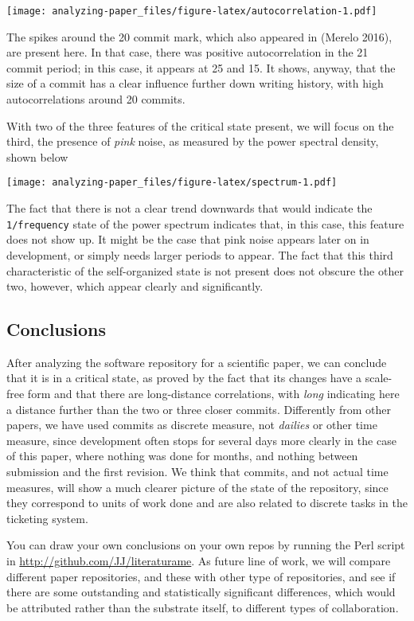 \documentclass[]{article}
\begin{document}
\texttt{[image: analyzing-paper\_files/figure-latex/autocorrelation-1.pdf]}

The spikes around the 20 commit mark, which also appeared in (Merelo
2016), are present here. In that case, there was positive
autocorrelation in the 21 commit period; in this case, it appears at 25
and 15. It shows, anyway, that the size of a commit has a clear
influence further down writing history, with high autocorrelations
around 20 commits.

With two of the three features of the critical state present, we will
focus on the third, the presence of \emph{pink} noise, as measured by
the power spectral density, shown below

\texttt{[image: analyzing-paper\_files/figure-latex/spectrum-1.pdf]}

The fact that there is not a clear trend downwards that would indicate
the \texttt{1/frequency} state of the power spectrum indicates that, in
this case, this feature does not show up. It might be the case that pink
noise appears later on in development, or simply needs larger periods to
appear. The fact that this third characteristic of the self-organized
state is not present does not obscure the other two, however, which
appear clearly and significantly.

\hypertarget{conc}{\subsection{Conclusions}\label{conc}}

After analyzing the software repository for a scientific paper, we can
conclude that it is in a critical state, as proved by the fact that its
changes have a scale-free form and that there are long-distance
correlations, with \emph{long} indicating here a distance further than
the two or three closer commits. Differently from other papers, we have
used commits as discrete measure, not \emph{dailies} or other time
measure, since development often stops for several days more clearly in
the case of this paper, where nothing was done for months, and nothing
between submission and the first revision. We think that commits, and
not actual time measures, will show a much clearer picture of the state
of the repository, since they correspond to units of work done and are
also related to discrete tasks in the ticketing system.

You can draw your own conclusions on your own repos by running the Perl
script in \url{http://github.com/JJ/literaturame}. As future line of
work, we will compare different paper repositories, and these with other
type of repositories, and see if there are some outstanding and
statistically significant differences, which would be attributed rather
than the substrate itself, to different types of collaboration.
\end{document}
